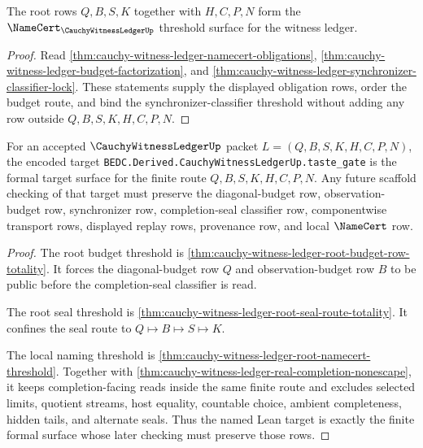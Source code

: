 \begin{theorem}\label{thm:cauchy-witness-ledger-root-namecert-threshold}
The root rows $Q,B,S,K$ together with $H,C,P,N$ form the $\NameCert_{\CauchyWitnessLedgerUp}$ threshold surface for the witness ledger.
\end{theorem}
\begin{proof}
Read \autoref{thm:cauchy-witness-ledger-namecert-obligations}, \autoref{thm:cauchy-witness-ledger-budget-factorization}, and \autoref{thm:cauchy-witness-ledger-synchronizer-classifier-lock}. These statements supply the displayed obligation rows, order the budget route, and bind the synchronizer-classifier threshold without adding any row outside $Q,B,S,K,H,C,P,N$.
\end{proof}

\begin{theorem}
\label{thm:cauchy-witness-ledger-formal-target-surface}
For an accepted $\CauchyWitnessLedgerUp$ packet $L=(Q,B,S,K,H,C,P,N)$, the encoded target \texttt{BEDC.Derived.CauchyWitnessLedgerUp.taste\_gate} is the formal target surface for the finite route $Q,B,S,K,H,C,P,N$. Any future scaffold checking of that target must preserve the diagonal-budget row, observation-budget row, synchronizer row, completion-seal classifier row, componentwise transport rows, displayed replay rows, provenance row, and local $\NameCert$ row.
\end{theorem}
\begin{proof}
The root budget threshold is \autoref{thm:cauchy-witness-ledger-root-budget-row-totality}. It forces the diagonal-budget row $Q$ and observation-budget row $B$ to be public before the completion-seal classifier is read.

The root seal threshold is \autoref{thm:cauchy-witness-ledger-root-seal-route-totality}. It confines the seal route to $Q \longmapsto B \longmapsto S \longmapsto K$.

The local naming threshold is \autoref{thm:cauchy-witness-ledger-root-namecert-threshold}. Together with \autoref{thm:cauchy-witness-ledger-real-completion-nonescape}, it keeps completion-facing reads inside the same finite route and excludes selected limits, quotient streams, host equality, countable choice, ambient completeness, hidden tails, and alternate seals. Thus the named Lean target is exactly the finite formal surface whose later checking must preserve those rows.
\end{proof}

